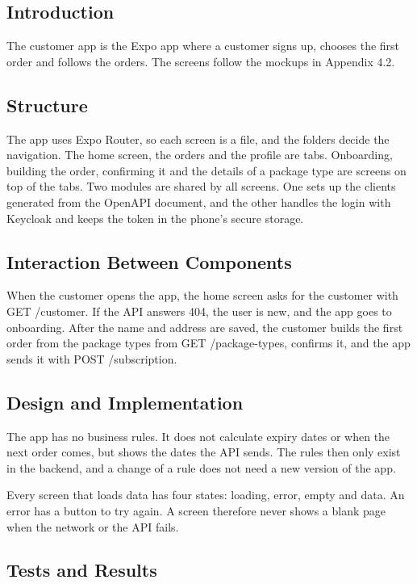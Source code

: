 \subsection{Introduction}

The customer app is the Expo app where a customer signs up, chooses the first order and
follows the orders. The screens follow the mockups in Appendix 4.2.

\subsection{Structure}

The app uses Expo Router, so each screen is a file, and the folders decide the
navigation. The home screen, the orders and the profile are tabs. Onboarding, building
the order, confirming it and the details of a package type are screens on top of the
tabs. Two modules are shared by all screens. One sets up the clients generated from the
OpenAPI document, and the other handles the login with Keycloak and keeps the token in
the phone's secure storage.

\subsection{Interaction Between Components}

When the customer opens the app, the home screen asks for the customer with GET
/customer. If the API answers 404, the user is new, and the app goes to onboarding. After
the name and address are saved, the customer builds the first order from the package
types from GET /package-types, confirms it, and the app sends it with POST
/subscription.

\subsection{Design and Implementation}

The app has no business rules. It does not calculate expiry dates or when the next order
comes, but shows the dates the API sends. The rules then only exist in the backend, and a
change of a rule does not need a new version of the app.

Every screen that loads data has four states: loading, error, empty and data. An error
has a button to try again. A screen therefore never shows a blank page when the network
or the API fails.

\subsection{Tests and Results}

